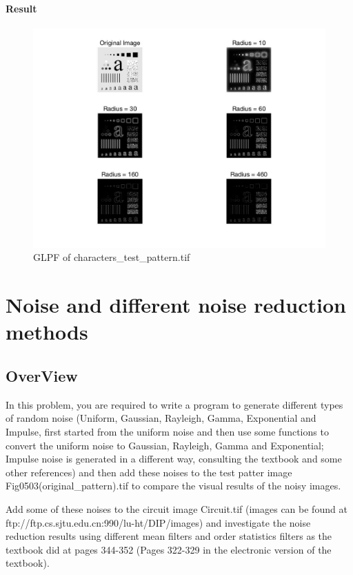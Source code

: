 \documentclass[11pt,oneside]{book}
\begin{document}
\subsubsection{Result}
\begin{figure}[!htb]
   \centering  
   \includegraphics[width=1.0\textwidth]{images/3/GHPF.jpg}
   \caption{GLPF of characters\_test\_pattern.tif}  
\end{figure}




\chapter{Noise and different noise reduction methods}
\section{OverView}
In this problem, you are required to write a program to generate different types of random noise (Uniform, Gaussian, Rayleigh, Gamma, Exponential and Impulse, first started from the uniform noise and then use some functions to convert the uniform noise to Gaussian, Rayleigh, Gamma and Exponential; Impulse noise is generated in a different way, consulting the textbook and some other references) and then add these noises to the test patter image Fig0503(original\_pattern).tif to compare the visual results of the noisy images.

Add some of these noises to the circuit image Circuit.tif (images can be found at ftp://ftp.cs.sjtu.edu.cn:990/lu-ht/DIP/images) and investigate the noise reduction results using different mean filters and order statistics filters as the textbook did at pages 344-352 (Pages 322-329 in the electronic version of the textbook).
\end{document}
